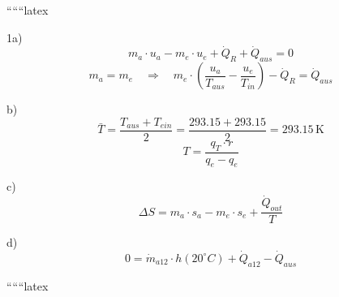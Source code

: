 
``````latex


1a)
\[
m_a \cdot u_a - m_e \cdot u_e + \dot{Q}_R + \dot{Q}_{aus} = 0
\]
\[
m_a = m_e \quad \Rightarrow \quad m_e \cdot \left( \frac{u_a}{T_{aus}} - \frac{u_e}{T_{in}} \right) - \dot{Q}_R = \dot{Q}_{aus}
\]

b)
\[
\bar{T} = \frac{T_{aus} + T_{ein}}{2} = \frac{293.15 + 293.15}{2} = 293.15 \, \text{K}
\]
\[
T = \frac{q_T \cdot r}{q_e - q_e}
\]

c)
\[
\Delta S = m_a \cdot s_a - m_e \cdot s_e + \frac{\dot{Q}_{out}}{T}
\]

d)
\[
0 = \dot{m}_{a12} \cdot h(20^\circ C) + \dot{Q}_{a12} - \dot{Q}_{aus}
\]

``````latex


